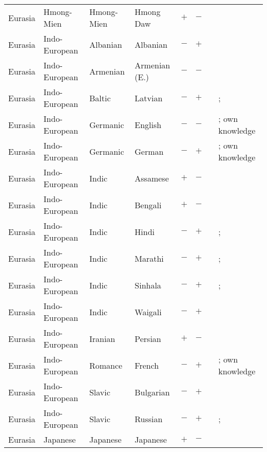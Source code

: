 \begin{landscape}
\begin{longtable}{l>{\raggedright\arraybackslash}p{2.2cm}>{\raggedright}p{2.5cm}>{\raggedright\arraybackslash}p{2.5cm}cc>{\raggedright\arraybackslash}p{3.4cm}>{\raggedright\arraybackslash}p{3.4cm}}
Eurasia & Hmong-Mien & Hmong-Mien & Hmong Daw & $+$ & $-$ & \citealt{Gil2013} & \citealt[297]{Nichols1992}\\
Eurasia & Indo-European & Albanian & Albanian & $-$ & $+$ & \citealt{Gil2013} & \citealt[17, 18, 29]{Matasovic2012a}\\
Eurasia & Indo-European & Armenian & Armenian (E.) & $-$ & $-$ & \citealt{Gil2013} & \citealt{Corbett2013}\\
Eurasia & Indo-European & Baltic & Latvian & $-$ & $+$ & \citealt{Gil2013} & \citealt{Corbett2013}; \citealt[66--73]{Kalnaca2014}\\
Eurasia & Indo-European & Germanic & English & $-$ & $-$ & \citealt{Gil2013} & \citealt{Corbett2013}; own knowledge\\
Eurasia & Indo-European & Germanic & German & $-$ & $+$ & \citealt{Gil2013} & \citealt{Corbett2013}; own knowledge\\
Eurasia & Indo-European & Indic & Assamese & $+$ & $-$ & \citealt{Gil2013} &  \citealt[415]{Goswami2003}\\
Eurasia & Indo-European & Indic & Bengali & $+$ & $-$ & \citealt{Gil2013} & \citealt[425]{Klaiman2009}\\
Eurasia & Indo-European & Indic & Hindi & $-$ & $+$ & \citealt{Gil2013} & \citealt{Corbett2013}; \citealt[1--22]{McGregor1986}\\
Eurasia & Indo-European & Indic & Marathi & $-$ & $+$ & \citealt{Gil2013} & \citealt{Corbett2013}; \citealt[702--707]{Pandharipande2003}\\
Eurasia & Indo-European & Indic & Sinhala & $-$ & $+$ & \citealt{Gil2013} & \citealt[passim]{Henadeerage2002}; \citealt[79--82, 228--229]{Chandralai2010}\\
Eurasia & Indo-European & Indic & Waigali & $-$ & $+$ & \citealt{Gil2013} & \citealt[297]{Nichols1992}\\
Eurasia & Indo-European & Iranian & Persian & $+$ & $-$ & \citealt{Gil2013} & \citealt{Corbett2013}\\
Eurasia & Indo-European & Romance & French & $-$ & $+$ & \citealt{Gil2013} & \citealt{Corbett2013}; own knowledge\\
Eurasia & Indo-European & Slavic & Bulgarian & $-$ & $+$ & \citealt{Gil2013} & \citealt[86--89]{Nicolova2017}\\
Eurasia & Indo-European & Slavic & Russian & $-$ & $+$ & \citealt{Gil2013} & \citealt{Corbett2013}; \citealt[54]{Wade2011}\\
Eurasia & Japanese & Japanese & Japanese & $+$ & $-$ & \citealt{Gil2013} & \citealt[passim]{Kaiser2001}\\

\end{longtable}
\end{landscape}
